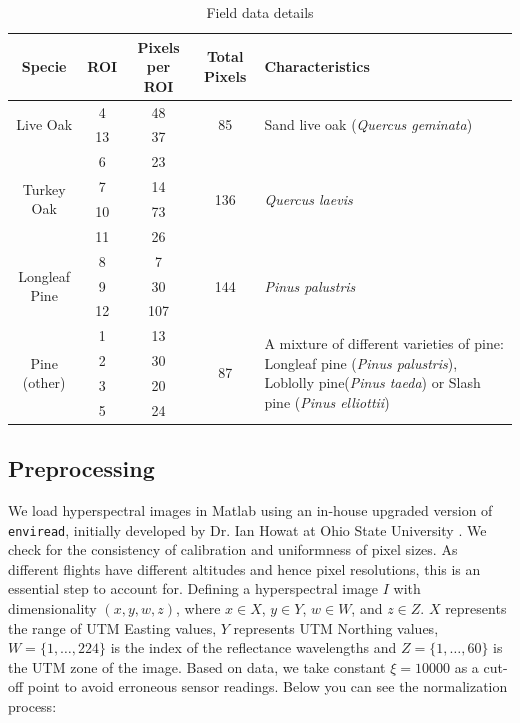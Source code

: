 \documentclass[remotesensing,article,accept,moreauthors,pdftex,12pt,a4paper]{mdpi}
\begin{document}
\begin{table}
\begin{center}

    \begin{tabular}{ | c | c | c | c | p{7cm} | }
    \hline
    Specie & ROI & Pixels per ROI & Total Pixels & Characteristics \\
    \hline
    \multirow{2}{*}{Live Oak} & 4  & 48 & \multirow{2}{*}{85} & \multirow{2}{*}{Sand live oak (\textit{Quercus geminata})} \\ 
 & 13 & 37 & & \\    
    \hline
    \multirow{4}{*}{Turkey Oak} & 6 & 23 &\multirow{4}{*}{136} & \multirow{4}{*}{\textit{Quercus laevis}} \\ 
     & 7 & 14 & & \\    
     & 10 & 73 &  & \\    
     & 11 & 26 & & \\    
    \hline
    \multirow{3}{*}{Longleaf Pine} & 8 & 7 & \multirow{3}{*}{144} & \multirow{3}{*}{\textit{Pinus palustris}} \\ 
     & 9 & 30 &  & \\    
     & 12 & 107 & & \\
     \hline
    \multirow{4}{*}{Pine (other)} & 1 & 13 & \multirow{4}{*}{87} & \multirow{4}{7cm}{A mixture of different varieties of pine:  Longleaf pine (\textit{Pinus palustris}), Loblolly pine(\textit{Pinus taeda}) or Slash pine (\textit{Pinus elliottii})} \\
     & 2 & 30 & & \\    
     & 3 & 20 & & \\    
     & 5 & 24 & & \\
    \hline
    
    \end{tabular}
    \caption{Field data details}
    \label{table:field data}
    \end{center}

\end{table}








\subsection{Preprocessing}

We load hyperspectral images in Matlab using an in-house upgraded version of \texttt{enviread}, initially developed by Dr. Ian Howat at Ohio State University \cite{howat2007enviread}. We check for the consistency of calibration and uniformness of pixel sizes. As different flights have different altitudes and hence pixel resolutions, this is an essential step to account for. Defining a hyperspectral image $I$ with dimensionality $(x,y,w,z)$, where $x \in X$, $y \in Y$, $w \in W$, and $z \in Z$. $X$ represents the range of UTM Easting values, $Y$ represents UTM Northing values, $W = \{1, \dotsc, 224\}$ is the index of the reflectance wavelengths and $Z = \{1, \dotsc, 60 \}$ is the UTM zone of the image. Based on data, we take constant $\xi = 10000$ as a cut-off point to avoid erroneous sensor readings. Below you can see the normalization process:
\end{document}

